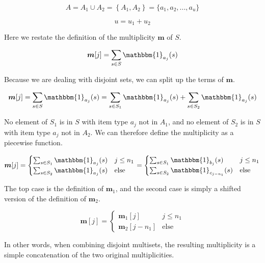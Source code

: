 \documentclass{article}
\begin{document}
\begin{equation}
    A = A_1 \cup A_2 = \left\{ A_1, A_2 \right \} = \{ a_1, a_2, ..., a_{u} \}
\end{equation}

\begin{equation}
    u = u_1 + u_2
\end{equation}

Here we restate the definition of the multiplicity $\bm{m}$ of $S$.

\begin{equation}
    \bm{m}[j] = \sum_{s \in S} \mathbbm{1}_{a_j}(s)
\end{equation} 

Because we are dealing with disjoint sets, we can split up the terms of $\bm{m}$.

\begin{equation}
    \bm{m}[j] = \sum_{s \in S} \mathbbm{1}_{a_j}(s) = \sum_{s \in S_1} \mathbbm{1}_{a_j}(s) + \sum_{s \in S_2} \mathbbm{1}_{a_j}(s)
\end{equation}

No element of $S_1$ is in $S$ with item type $a_j$ not in $A_1$, and no element of $S_2$ is in $S$ with item type $a_j$ not in $A_2$. We can therefore define the multiplicity as a piecewise function.

\begin{equation}
    \bm{m}[j] = \begin{cases} \sum_{s \in S_1} \mathbbm{1}_{a_j}(s) & j\leq n_1 \\  \sum_{s \in S_2} \mathbbm{1}_{a_j}(s) & \text{else} \end{cases} = \begin{cases} \sum_{s \in S_1} \mathbbm{1}_{b_{j}}(s) & j\leq n_1 \\  \sum_{s \in S_2} \mathbbm{1}_{c_{j - n_1}}(s) & \text{else} \end{cases}
\end{equation}

The top case is the definition of $\bm{m}_1$, and the second case is simply a shifted version of the definition of $\bm{m}_2$. 

\begin{equation}
    \bm{m}[j] = \begin{cases} \bm{m}_1[j] & j\leq n_1 \\  \bm{m}_2[j - n_1] & \text{else} \end{cases}
\end{equation}

In other words, when combining disjoint multisets, the resulting multiplicity is a simple concatenation of the two original multiplicities.
\end{document}
